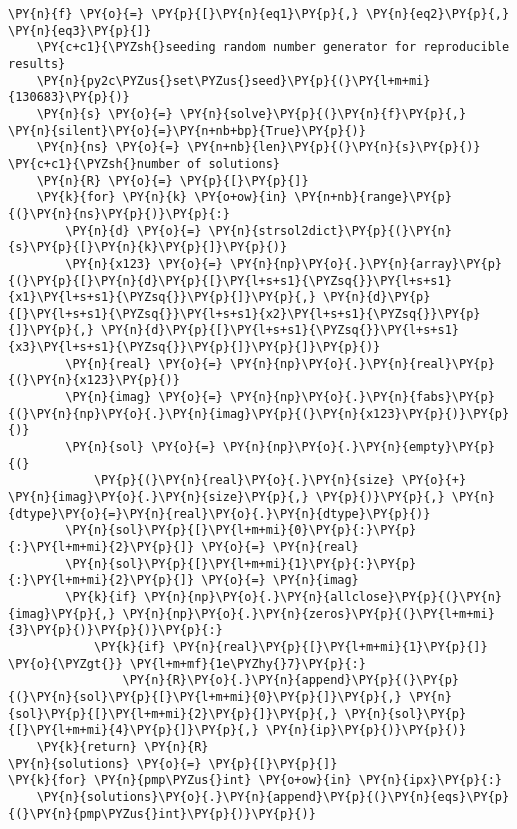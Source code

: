 \begin{Verbatim}[commandchars=\\\{\}]
    \PY{n}{f} \PY{o}{=} \PY{p}{[}\PY{n}{eq1}\PY{p}{,} \PY{n}{eq2}\PY{p}{,} \PY{n}{eq3}\PY{p}{]}
    \PY{c+c1}{\PYZsh{}seeding random number generator for reproducible results}
    \PY{n}{py2c\PYZus{}set\PYZus{}seed}\PY{p}{(}\PY{l+m+mi}{130683}\PY{p}{)}
    \PY{n}{s} \PY{o}{=} \PY{n}{solve}\PY{p}{(}\PY{n}{f}\PY{p}{,} \PY{n}{silent}\PY{o}{=}\PY{n+nb+bp}{True}\PY{p}{)}
    \PY{n}{ns} \PY{o}{=} \PY{n+nb}{len}\PY{p}{(}\PY{n}{s}\PY{p}{)}  \PY{c+c1}{\PYZsh{}number of solutions}
    \PY{n}{R} \PY{o}{=} \PY{p}{[}\PY{p}{]}
    \PY{k}{for} \PY{n}{k} \PY{o+ow}{in} \PY{n+nb}{range}\PY{p}{(}\PY{n}{ns}\PY{p}{)}\PY{p}{:}
        \PY{n}{d} \PY{o}{=} \PY{n}{strsol2dict}\PY{p}{(}\PY{n}{s}\PY{p}{[}\PY{n}{k}\PY{p}{]}\PY{p}{)}
        \PY{n}{x123} \PY{o}{=} \PY{n}{np}\PY{o}{.}\PY{n}{array}\PY{p}{(}\PY{p}{[}\PY{n}{d}\PY{p}{[}\PY{l+s+s1}{\PYZsq{}}\PY{l+s+s1}{x1}\PY{l+s+s1}{\PYZsq{}}\PY{p}{]}\PY{p}{,} \PY{n}{d}\PY{p}{[}\PY{l+s+s1}{\PYZsq{}}\PY{l+s+s1}{x2}\PY{l+s+s1}{\PYZsq{}}\PY{p}{]}\PY{p}{,} \PY{n}{d}\PY{p}{[}\PY{l+s+s1}{\PYZsq{}}\PY{l+s+s1}{x3}\PY{l+s+s1}{\PYZsq{}}\PY{p}{]}\PY{p}{]}\PY{p}{)}
        \PY{n}{real} \PY{o}{=} \PY{n}{np}\PY{o}{.}\PY{n}{real}\PY{p}{(}\PY{n}{x123}\PY{p}{)}
        \PY{n}{imag} \PY{o}{=} \PY{n}{np}\PY{o}{.}\PY{n}{fabs}\PY{p}{(}\PY{n}{np}\PY{o}{.}\PY{n}{imag}\PY{p}{(}\PY{n}{x123}\PY{p}{)}\PY{p}{)}
        \PY{n}{sol} \PY{o}{=} \PY{n}{np}\PY{o}{.}\PY{n}{empty}\PY{p}{(}
            \PY{p}{(}\PY{n}{real}\PY{o}{.}\PY{n}{size} \PY{o}{+} \PY{n}{imag}\PY{o}{.}\PY{n}{size}\PY{p}{,} \PY{p}{)}\PY{p}{,} \PY{n}{dtype}\PY{o}{=}\PY{n}{real}\PY{o}{.}\PY{n}{dtype}\PY{p}{)}
        \PY{n}{sol}\PY{p}{[}\PY{l+m+mi}{0}\PY{p}{:}\PY{p}{:}\PY{l+m+mi}{2}\PY{p}{]} \PY{o}{=} \PY{n}{real}
        \PY{n}{sol}\PY{p}{[}\PY{l+m+mi}{1}\PY{p}{:}\PY{p}{:}\PY{l+m+mi}{2}\PY{p}{]} \PY{o}{=} \PY{n}{imag}
        \PY{k}{if} \PY{n}{np}\PY{o}{.}\PY{n}{allclose}\PY{p}{(}\PY{n}{imag}\PY{p}{,} \PY{n}{np}\PY{o}{.}\PY{n}{zeros}\PY{p}{(}\PY{l+m+mi}{3}\PY{p}{)}\PY{p}{)}\PY{p}{:}
            \PY{k}{if} \PY{n}{real}\PY{p}{[}\PY{l+m+mi}{1}\PY{p}{]} \PY{o}{\PYZgt{}} \PY{l+m+mf}{1e\PYZhy{}7}\PY{p}{:}
                \PY{n}{R}\PY{o}{.}\PY{n}{append}\PY{p}{(}\PY{p}{(}\PY{n}{sol}\PY{p}{[}\PY{l+m+mi}{0}\PY{p}{]}\PY{p}{,} \PY{n}{sol}\PY{p}{[}\PY{l+m+mi}{2}\PY{p}{]}\PY{p}{,} \PY{n}{sol}\PY{p}{[}\PY{l+m+mi}{4}\PY{p}{]}\PY{p}{,} \PY{n}{ip}\PY{p}{)}\PY{p}{)}
    \PY{k}{return} \PY{n}{R}
\PY{n}{solutions} \PY{o}{=} \PY{p}{[}\PY{p}{]}
\PY{k}{for} \PY{n}{pmp\PYZus{}int} \PY{o+ow}{in} \PY{n}{ipx}\PY{p}{:}
    \PY{n}{solutions}\PY{o}{.}\PY{n}{append}\PY{p}{(}\PY{n}{eqs}\PY{p}{(}\PY{n}{pmp\PYZus{}int}\PY{p}{)}\PY{p}{)}

\end{Verbatim}
